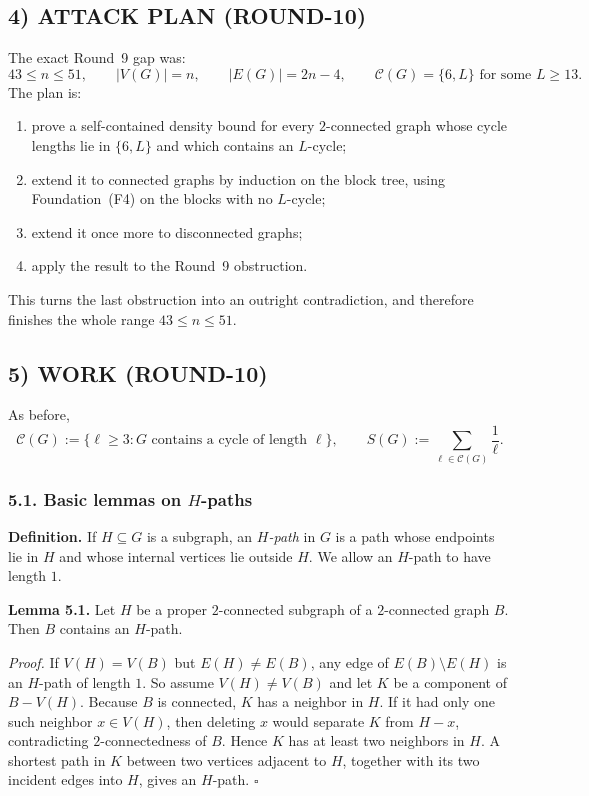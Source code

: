 \subsection*{4) ATTACK PLAN (ROUND-10)}

The exact Round~9 gap was:
\[
43\le n\le 51,
\qquad
|V(G)|=n,
\qquad
|E(G)|=2n-4,
\qquad
\mathcal C(G)=\{6,L\}\text{ for some }L\ge 13.
\]
The plan is:
\begin{enumerate}
\item prove a self-contained density bound for every $2$-connected graph whose cycle lengths lie in $\{6,L\}$ and which contains an $L$-cycle;
\item extend it to connected graphs by induction on the block tree, using Foundation~(F4) on the blocks with no $L$-cycle;
\item extend it once more to disconnected graphs;
\item apply the result to the Round~9 obstruction.
\end{enumerate}
This turns the last obstruction into an outright contradiction, and therefore finishes the whole range $43\le n\le 51$.

\subsection*{5) WORK (ROUND-10)}

As before,
\[
\mathcal C(G):=\{\ell\ge 3:\text{$G$ contains a cycle of length $\ell$}\},
\qquad
S(G):=\sum_{\ell\in\mathcal C(G)}\frac1\ell.
\]

\subsubsection*{5.1. Basic lemmas on $H$-paths}

\textbf{Definition.}
If $H\subseteq G$ is a subgraph, an \emph{$H$-path} in $G$ is a path whose endpoints lie in $H$ and whose internal vertices lie outside $H$. We allow an $H$-path to have length $1$.

\medskip
\textbf{Lemma 5.1.}
Let $H$ be a proper $2$-connected subgraph of a $2$-connected graph $B$. Then $B$ contains an $H$-path.

\medskip
\textit{Proof.}
If $V(H)=V(B)$ but $E(H)\neq E(B)$, any edge of $E(B)\setminus E(H)$ is an $H$-path of length $1$.
So assume $V(H)\neq V(B)$ and let $K$ be a component of $B-V(H)$.
Because $B$ is connected, $K$ has a neighbor in $H$.
If it had only one such neighbor $x\in V(H)$, then deleting $x$ would separate $K$ from $H-x$, contradicting $2$-connectedness of $B$.
Hence $K$ has at least two neighbors in $H$.
A shortest path in $K$ between two vertices adjacent to $H$, together with its two incident edges into $H$, gives an $H$-path.
\hfill$\square$

